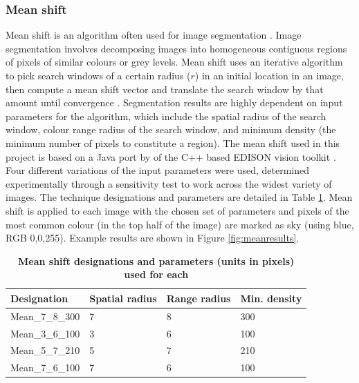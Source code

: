 \documentclass[final,3p,times,authoryear]{elsarticle}
\begin{document}
\subsubsection{Mean shift}\label{sec:mean}

Mean shift is an algorithm often used for image segmentation \citep{Comaniciu1997,Comaniciu2002}. Image segmentation involves decomposing images into homogeneous contiguous regions of pixels of similar colours or grey levels. Mean shift uses an iterative algorithm to pick search windows of a certain radius ($r$) in an initial location in an image, then compute a mean shift vector and translate the search window by that amount until convergence \citep{Comaniciu1997}. Segmentation results are highly dependent on input parameters for the algorithm, which include the spatial radius of the search window, colour range radius of the search window, and minimum density (the minimum number of pixels to constitute a region). The mean shift used in this project is based on a Java port by \cite{Pangburn2002} of the C++ based EDISON vision toolkit \citep{Christoudias2002}. Four different variations of the input parameters were used, determined experimentally through a sensitivity test to work across the widest variety of images. The technique designations and parameters are detailed in Table \ref{tab:techniques2}. Mean shift is applied to each image with the chosen set of parameters and pixels of the most common colour (in the top half of the image) are marked as sky (using blue, RGB 0,0,255). Example results are shown in Figure \ref{fig:meanresults}.


\begin{table}[!htbp]
\caption{\bf Mean shift designations and parameters (units in pixels) used for each \label{tab:techniques2}}     
\begin{tabular}{ l  l  l l}
\textbf{Designation}  & \textbf{Spatial radius}&\textbf{Range radius}&\textbf{Min. density}   \\ \hline
Mean\_7\_8\_300 & 7 & 8& 300 \\
Mean\_3\_6\_100	 & 3& 6& 100 \\
Mean\_5\_7\_210	 & 5& 7& 210 \\	 
Mean\_7\_6\_100	 & 7& 6& 100 \\

\hline
\end{tabular}
\end{table}
\end{document}
